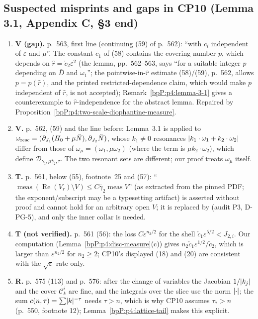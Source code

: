 \subsection{Suspected misprints and gaps in CP10 (Lemma 3.1, Appendix C, \S3 end)}\label{bpP:p4:errata}
\begin{enumerate}[label=(E\arabic*)]
\item \textbf{V (gap).} p.~563, first line (continuing (59) of p.~562): ``with $c_i$ independent of $\varepsilon$ and $\mu$''. The constant $c_1$ of (58) contains the covering number $p$, which depends on $\hat r=\check c_2\varepsilon^2$ (the lemma, pp.~562--563, says ``for a suitable integer $p$ depending on $\bar D$ and $\omega_1$''; the pointwise-in-$\hat r$ estimate (58)/(59), p.~562, allows $p=p(\hat r)$, and the printed restricted-dependence claim, which would make $p$ independent of $\hat r$, is not accepted); Remark~\ref{bpP:p4:lemma-3-1} gives a counterexample to $\hat r$-independence for the abstract lemma. Repaired by Proposition~\ref{bpP:p4:two-scale-diophantine-measure}.
\item \textbf{V.} p.~562, (59) and the line before: Lemma~3.1 is applied to $\omega_{\rm resc}=(\partial_{J_1}(H_0+\mu\breve N),\partial_{J_2}\breve N)$, whose $k_1\ne0$ resonances $\lvert k_1\cdot\omega_1+k_2\cdot\omega_2\rvert$ differ from those of $\omega_\mu=(\omega_1,\mu\omega_2)$ (where the term is $\mu k_2\cdot\omega_2$), which define $\mathcal D_{\gamma_1,\mu\bar\gamma_2,\tau}$. The two resonant sets are different; our proof treats $\omega_\mu$ itself.
\item \textbf{T.} p.~561, below (55), footnote~25 and (57): ``$\operatorname{meas}(\operatorname{Re}(V_r)\setminus V)\le C\bar\gamma_2\operatorname{meas}V$'' (as extracted from the pinned PDF; the exponent/subscript may be a typesetting artifact) is asserted without proof and cannot hold for an arbitrary open $V$; it is replaced by  (audit P3, D-PG-5), and only the inner collar is needed.
\item \textbf{T (not verified).} p.~561 (56): the loss $C\varepsilon^{n_2/2}$ for the shell $\check c_1\varepsilon^{5/2}<J_{2,i}$. Our computation (Lemma~\ref{bpP:p4:disc-measure}(c)) gives $n_2\check c_1\varepsilon^{1/2}/\check c_2$, which is larger than $\varepsilon^{n_2/2}$ for $n_2\ge2$; CP10's displayed (18) and (20) are consistent with the $\sqrt\varepsilon$ rate only.
\item \textbf{R.} p.~575 (113) and p.~576: after the change of variables the Jacobian $1/\lvert k_j\rvert$ and the cover $\mathcal C_k^i$ are fine, and the integrals over the slice use the norm $\lvert \cdot\rvert$; the sum $c(n,\tau)=\sum\lvert k\rvert^{-\tau}$ needs $\tau>n$, which is why CP10 assumes $\tau_*>n$ (p.~550, footnote 12); Lemma~\ref{bpP:p4:lattice-tail} makes this explicit.
\end{enumerate}

